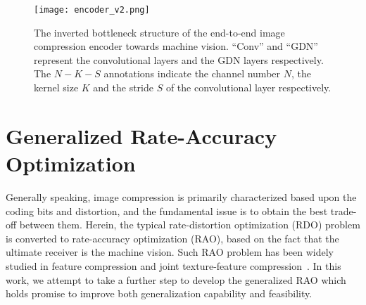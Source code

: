 \documentclass[transmag]{IEEEtran}
\begin{document}
\begin{figure}[bt]
\centerline{\texttt{[image: encoder\_v2.png]}}
\vspace{-2mm}
\caption{The inverted bottleneck structure of the end-to-end image compression encoder towards machine vision. ``Conv'' and ``GDN'' represent the convolutional layers and the GDN layers respectively. The $N-K-S$ annotations indicate the channel number $N$, the kernel size $K$ and the stride $S$ of the convolutional layer respectively.}
\label{encoder}
\vspace{-4mm}
\end{figure}


\section{Generalized Rate-Accuracy Optimization}
Generally speaking, image compression is primarily characterized based upon the coding bits and distortion, and the fundamental issue is to obtain the best trade-off between them. Herein, the typical rate-distortion optimization (RDO) problem is converted to rate-accuracy optimization (RAO), based on the fact that the ultimate receiver is the machine vision. Such RAO problem has been widely studied in feature compression and joint texture-feature compression~\cite{li2018joint, zhang2016joint, ma2018joint, ding2017rate}. In this work, we attempt to take a further step to develop the generalized RAO which holds promise to improve both generalization capability and feasibility.  
\end{document}
